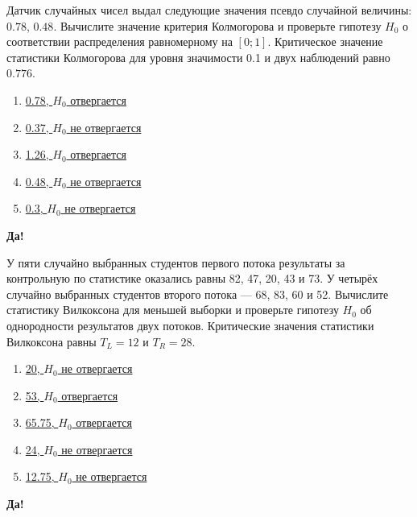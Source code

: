 \documentclass[t]{beamer}
\begin{document}
 \begin{frame} \label{29-Yes} 
\begin{block}{29} 

Датчик случайных чисел выдал следующие значения псевдо случайной величины: $0.78$, $0.48$. Вычислите значение критерия Колмогорова и проверьте гипотезу $H_0$ о соответствии распределения равномерному на $[0;1]$. Критическое значение статистики Колмогорова для уровня значимости 0.1 и двух наблюдений равно $0.776$.
 


 \end{block} 
\begin{enumerate} 
\item[] \hyperlink{29-No}{\beamergotobutton{} 0.78, $H_0$ отвергается}
\item[] \hyperlink{29-No}{\beamergotobutton{} 0.37, $H_0$ не отвергается}
\item[] \hyperlink{29-No}{\beamergotobutton{} 1.26, $H_0$ отвергается}
\item[] \hyperlink{29-Yes}{\beamergotobutton{} 0.48, $H_0$ не отвергается}
\item[] \hyperlink{29-No}{\beamergotobutton{} 0.3, $H_0$ не отвергается}
\end{enumerate} 

 \textbf{Да!} 
 \hyperlink{30}{}\end{frame} 


 \begin{frame} \label{30-Yes} 
\begin{block}{30} 

У пяти случайно выбранных студентов первого потока результаты за контрольную по статистике оказались равны  82, 47, 20, 43 и 73. У четырёх случайно выбранных студентов второго потока — 68, 83, 60 и 52. Вычислите статистику Вилкоксона для меньшей выборки и проверьте гипотезу $H_0$ об однородности результатов  двух потоков. Критические значения статистики Вилкоксона равны $T_L=12$ и $T_R=28$.
 


 \end{block} 
\begin{enumerate} 
\item[] \hyperlink{30-No}{\beamergotobutton{} 20, $H_0$ не отвергается}
\item[] \hyperlink{30-No}{\beamergotobutton{} 53, $H_0$ отвергается}
\item[] \hyperlink{30-No}{\beamergotobutton{} 65.75, $H_0$ отвергается}
\item[] \hyperlink{30-Yes}{\beamergotobutton{} 24, $H_0$ не отвергается}
\item[] \hyperlink{30-No}{\beamergotobutton{} 12.75, $H_0$ не отвергается}
\end{enumerate} 

 \textbf{Да!} 
 \hyperlink{31}{}\end{frame} 
\end{document}
